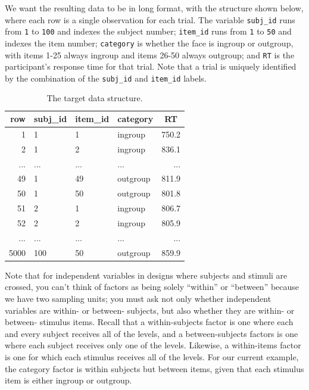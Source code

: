 \documentclass[
  english,
  doc,floatsintext]{apa6}
\begin{document}
We want the resulting data to be in long format, with the structure shown below, where each row is a single observation for each trial. The variable \texttt{subj\_id} runs from \texttt{1} to \texttt{100} and indexes the subject number; \texttt{item\_id} runs from \texttt{1} to \texttt{50} and indexes the item number; \texttt{category} is whether the face is ingroup or outgroup, with items 1-25 always ingroup and items 26-50 always outgroup; and \texttt{RT} is the participant's response time for that trial. Note that a trial is uniquely identified by the combination of the \texttt{subj\_id} and \texttt{item\_id} labels.

\begin{table}[H]

\begin{center}
\begin{threeparttable}

\caption{\label{tab:data-example}The target data structure.}

\begin{tabular}{rlllr}
\toprule
row & \multicolumn{1}{c}{subj\_id} & \multicolumn{1}{c}{item\_id} & \multicolumn{1}{c}{category} & \multicolumn{1}{c}{RT}\\
\midrule
1 & 1 & 1 & ingroup & 750.2\\
2 & 1 & 2 & ingroup & 836.1\\
... & ... & ... & ... & ...\\
49 & 1 & 49 & outgroup & 811.9\\
50 & 1 & 50 & outgroup & 801.8\\
51 & 2 & 1 & ingroup & 806.7\\
52 & 2 & 2 & ingroup & 805.9\\
... & ... & ... & ... & ...\\
5000 & 100 & 50 & outgroup & 859.9\\
\bottomrule
\end{tabular}

\end{threeparttable}
\end{center}

\end{table}

Note that for independent variables in designs where subjects and stimuli are crossed, you can't think of factors as being solely \enquote{within} or \enquote{between} because we have two sampling units; you must ask not only whether independent variables are within- or between- subjects, but also whether they are within- or between- stimulus items. Recall that a within-subjects factor is one where each and every subject receives all of the levels, and a between-subjects factors is one where each subject receives only one of the levels. Likewise, a within-items factor is one for which each stimulus receives all of the levels. For our current example, the category factor is within subjects but between items, given that each stimulus item is either ingroup or outgroup.
\end{document}
